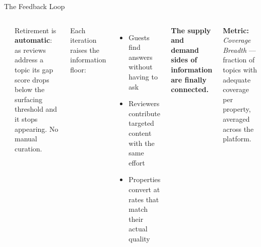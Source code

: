 \documentclass[aspectratio=169,10pt]{beamer}
\begin{document}
\begin{frame}{The Feedback Loop}

\begin{columns}[T]

\begin{center}
\end{center}

Retirement is \textbf{automatic}: as reviews address a topic its gap score drops
below the surfacing threshold and it stops appearing. No manual curation.

\smallskip
Each iteration raises the information floor:
\begin{itemize}
  \item Guests find answers without having to ask
  \item Reviewers contribute targeted content with the same effort
  \item Properties convert at rates that match their actual quality
\end{itemize}

\smallskip
\textbf{The supply and demand sides of information are finally connected.}

\smallskip
\textbf{Metric:} \textit{Coverage Breadth} --- fraction of topics with adequate
coverage per property, averaged across the platform.

\end{columns}

\end{frame}
\end{document}
